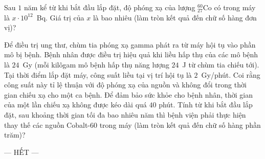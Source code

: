 \begin{ex}
\begin{minipage}[t]{0.2\linewidth}
		\end{minipage}
		\par\noindent
		Sau $1$ năm kể từ khi bắt đầu lắp đặt, độ phóng xạ của lượng ${}^{60}_{27}\text{Co}$ có trong máy là $x\cdot 10^{12}$~Bq. Giá trị của $x$ là bao nhiêu (làm tròn kết quả đến chữ số hàng đơn vị)?
		\par
	\end{ex}

	\begin{ex}%
		\label{BacNinh-SoGD-Lan2-III6}
		Để điều trị ung thư, chùm tia phóng xạ gamma phát ra từ máy hội tụ vào phần mô bị bệnh. Bệnh nhân được điều trị hiệu quả khi liều hấp thụ của các mô bệnh là $24$~Gy (mỗi kilôgam mô bệnh hấp thụ năng lượng $24$~J từ chùm tia chiếu tới). Tại thời điểm lắp đặt máy, công suất liều tại vị trí hội tụ là $2$~Gy/phút. Coi rằng công suất này tỉ lệ thuận với độ phóng xạ của nguồn và không đổi trong thời gian chiếu xạ cho một ca bệnh. Để đảm bảo sức khỏe cho bệnh nhân, thời gian của một lần chiếu xạ không được kéo dài quá $40$ phút. Tính từ khi bắt đầu lắp đặt, sau khoảng thời gian tối đa bao nhiêu năm thì bệnh viện phải thực hiện thay thế các nguồn Cobalt-60 trong máy (làm tròn kết quả đến chữ số hàng phần trăm)?
		\par
	\end{ex}

	\centerline{--- HẾT ---}


